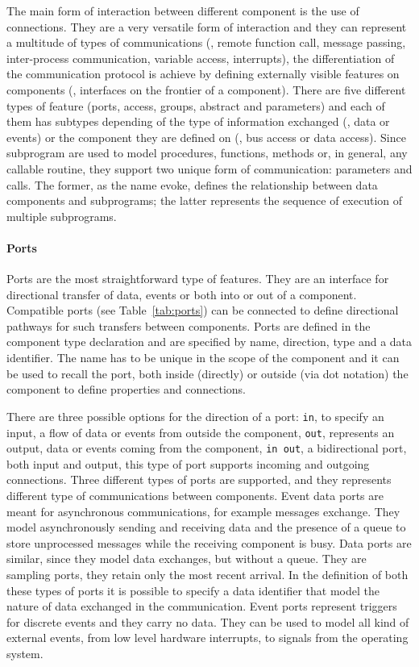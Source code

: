 The main form of interaction between different component is the use of connections. They are a very versatile form of interaction and they can represent a multitude of types of communications (\eg, remote function call, message passing, inter-process communication, variable access, interrupts), the differentiation of the communication protocol is achieve by defining externally visible features on components (\ie, interfaces on the frontier of a component). There are five different types of feature (ports, access, groups, abstract and parameters) and each of them has subtypes depending of the type of  information exchanged (\eg, data or events) or the component they are defined on (\eg, bus access or data access). Since subprogram are used to model procedures, functions, methods or, in general, any callable routine, they support two unique form of communication: parameters and calls. The former, as the name evoke, defines the relationship between data components and subprograms; the latter represents the sequence of execution of multiple subprograms.

\paragraph{Ports}
Ports are the most straightforward type of features. They are an interface for directional transfer of data, events or both into or out of a component. Compatible ports (see Table~\ref{tab:ports}) can be connected to define directional pathways for such transfers between components. Ports are defined in the component type declaration and are specified by name, direction, type and a data identifier. The name has to be unique in the scope of the component and it can be used to recall the port, both inside (directly) or outside (via dot notation) the component to define properties and connections.

There are three possible options for the direction of a port: \texttt{in}, to specify an input, a flow of data or events from outside the component, \texttt{out}, represents an output, data or events coming from the component, \texttt{in out}, a bidirectional port, both input and output, this type of port supports incoming and outgoing connections. Three different types of ports are supported, and they represents different type of communications between components. Event data ports are meant for asynchronous communications, for example messages exchange. They model asynchronously sending and receiving data and the presence of a queue to store unprocessed messages while the receiving component is busy. Data ports are similar, since they model data exchanges, but without a queue. They are sampling ports, they retain only the most recent arrival. In the definition of both these types of ports it is possible to specify a data identifier that model the nature of data exchanged in the communication. Event ports represent triggers for discrete events and they carry no data. They can be used to model all kind of external events, from low level hardware interrupts, to signals from the operating system.

